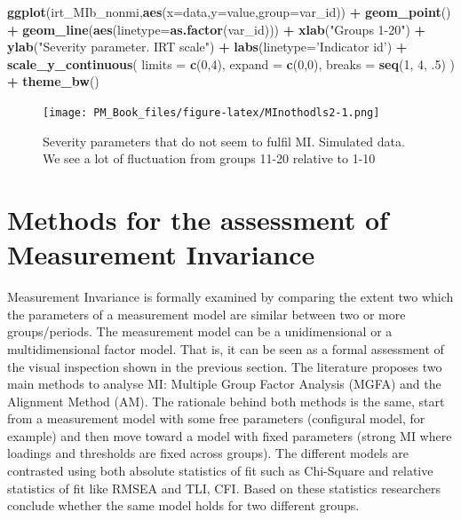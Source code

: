 \documentclass[]{book}
\newenvironment{Shaded}{\begin{snugshade}}{\end{snugshade}}
\newcommand{\DataTypeTok}[1]{\textcolor[rgb]{0.13,0.29,0.53}{#1}}
\newcommand{\DecValTok}[1]{\textcolor[rgb]{0.00,0.00,0.81}{#1}}
\newcommand{\FloatTok}[1]{\textcolor[rgb]{0.00,0.00,0.81}{#1}}
\newcommand{\KeywordTok}[1]{\textcolor[rgb]{0.13,0.29,0.53}{\textbf{#1}}}
\newcommand{\NormalTok}[1]{#1}
\newcommand{\OperatorTok}[1]{\textcolor[rgb]{0.81,0.36,0.00}{\textbf{#1}}}
\newcommand{\StringTok}[1]{\textcolor[rgb]{0.31,0.60,0.02}{#1}}
\begin{document}
\begin{Shaded}
\begin{Highlighting}[]
\KeywordTok{ggplot}\NormalTok{(irt_MIb_nonmi,}\KeywordTok{aes}\NormalTok{(}\DataTypeTok{x=}\NormalTok{data,}\DataTypeTok{y=}\NormalTok{value,}\DataTypeTok{group=}\NormalTok{var_id)) }\OperatorTok{+}\StringTok{ }\KeywordTok{geom_point}\NormalTok{()  }\OperatorTok{+}\StringTok{ }
\StringTok{  }\KeywordTok{geom_line}\NormalTok{(}\KeywordTok{aes}\NormalTok{(}\DataTypeTok{linetype=}\KeywordTok{as.factor}\NormalTok{(var_id))) }\OperatorTok{+}\StringTok{ }
\StringTok{  }\KeywordTok{xlab}\NormalTok{(}\StringTok{"Groups 1-20"}\NormalTok{) }\OperatorTok{+}\StringTok{ }\KeywordTok{ylab}\NormalTok{(}\StringTok{"Severity parameter. IRT scale"}\NormalTok{) }\OperatorTok{+}\StringTok{ }
\StringTok{  }\KeywordTok{labs}\NormalTok{(}\DataTypeTok{linetype=}\StringTok{'Indicator id'}\NormalTok{) }\OperatorTok{+}\StringTok{  }
\StringTok{  }\KeywordTok{scale_y_continuous}\NormalTok{( }\DataTypeTok{limits =} \KeywordTok{c}\NormalTok{(}\DecValTok{0}\NormalTok{,}\DecValTok{4}\NormalTok{), }\DataTypeTok{expand =} \KeywordTok{c}\NormalTok{(}\DecValTok{0}\NormalTok{,}\DecValTok{0}\NormalTok{), }\DataTypeTok{breaks =} \KeywordTok{seq}\NormalTok{(}\DecValTok{1}\NormalTok{, }\DecValTok{4}\NormalTok{, }\FloatTok{.5}\NormalTok{) ) }\OperatorTok{+}\StringTok{ }
\StringTok{  }\KeywordTok{theme_bw}\NormalTok{()  }
\end{Highlighting}
\end{Shaded}

\begin{figure}
\centering
\texttt{[image: PM\_Book\_files/figure-latex/MInothodls2-1.png]}
\caption{\label{fig:MInothodls2}Severity parameters that do not seem to fulfil MI. Simulated data. We see a lot of fluctuation from groups 11-20 relative to 1-10}
\end{figure}

\hypertarget{methods-for-the-assessment-of-measurement-invariance}{%
\section{Methods for the assessment of Measurement Invariance}\label{methods-for-the-assessment-of-measurement-invariance}}

Measurement Invariance is formally examined by comparing the extent two which the parameters of a measurement model are similar between two or more groups/periods. The measurement model can be a unidimensional or a multidimensional factor model. That is, it can be seen as a formal assessment of the visual inspection shown in the previous section. The literature proposes two main methods to analyse MI: Multiple Group Factor Analysis (MGFA) and the Alignment Method (AM). The rationale behind both methods is the same, start from a measurement model with some free parameters (configural model, for example) and then move toward a model with fixed parameters (strong MI where loadings and thresholds are fixed across groups). The different models are contrasted using both absolute statistics of fit such as Chi-Square and relative statistics of fit like RMSEA and TLI, CFI. Based on these statistics researchers conclude whether the same model holds for two different groups.
\end{document}
